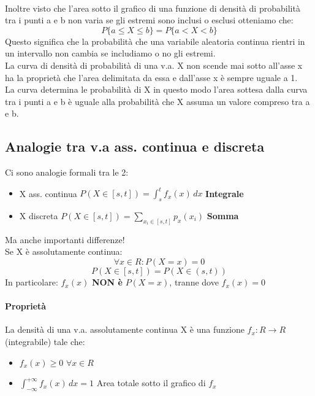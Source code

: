 \\ Inoltre visto che l'area sotto il grafico di una funzione di densità di probabilità
tra i punti a e b non varia se gli estremi sono inclusi o esclusi otteniamo che:
\begin{equation*}
    P\{a \leq X \leq b\} = P\{a < X < b \}
\end{equation*}
Questo significa che la probabilità che una variabile aleatoria continua rientri in un
intervallo non cambia se includiamo o no gli estremi.
\\ La curva di densità di probabilità di una v.a. X non scende mai sotto all'asse x ha la
proprietà che l'area delimitata da essa e dall'asse x è sempre uguale a 1.
\\ La curva determina le probabilità di X in questo modo l'area sottesa dalla curva tra i punti a
e b è uguale alla probabilità che X assuma un valore compreso tra a e b.

\subsection*{Analogie tra v.a ass. continua e discreta}
Ci sono analogie formali tra le 2: \begin{itemize}
    \item X ass. continua $P(X \in [s, t]) = \int_{s}^{t} f_x (x) \,dx$ \textbf{Integrale}
    \item X discreta $P(X \in [s, t]) = \sum_{x_i \in [s,t]}p_x (x_i)$ \textbf{Somma}
\end{itemize}
Ma anche importanti differenze!
\\ Se X è assolutamente continua:
\begin{equation*}
    \forall x \in R: P(X=x) = 0
\end{equation*}
\begin{equation*}
    P(X \in [s,t]) = P(X \in (s, t))
\end{equation*}
In particolare: $f_x (x)$ \textbf{NON è} $P(X=x)$, tranne dove $f_x (x) = 0$
\paragraph*{Proprietà} La densità di una v.a. assolutamente continua X è una funzione 
$f_x : R \to R$ (integrabile) tale che: \begin{itemize}
    \item $f_x (x) \geq 0$ $\forall x \in R$
    \item $\int_{-\infty}^{+\infty} f_x (x) \,dx = 1$ Area 
    totale sotto il grafico di $f_x$
\end{itemize}
